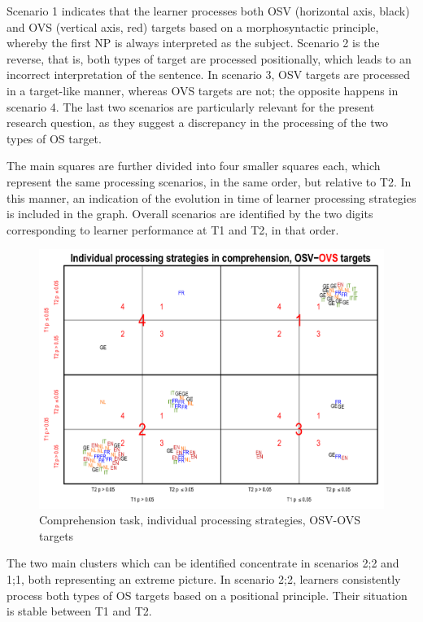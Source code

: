 Scenario 1 indicates that the learner processes both OSV (horizontal axis, black) and OVS (vertical axis, red) targets based on a morphosyntactic principle, whereby the first NP is always interpreted as the subject. Scenario 2 is the reverse, that is, both types of target are processed positionally, which leads to an incorrect interpretation of the sentence. In scenario 3, OSV targets are processed in a target-like manner, whereas OVS targets are not; the opposite happens in scenario 4. The last two scenarios are particularly relevant for the present research question, as they suggest a discrepancy in the processing of the two types of OS target.

The main squares are further divided into four smaller squares each, which represent the same processing scenarios, in the same order, but relative to T2. In this manner, an indication of the evolution in time of learner processing strategies is included in the graph. Overall scenarios are identified by the two digits corresponding to learner performance at T1 and T2, in that order.

\begin{figure}
    \includegraphics[width=\textwidth]{figures/05-8.pdf}
    \caption{Comprehension task, individual processing strategies, OSV-OVS targets}
    \label{fig:05:8}
\end{figure}

The two main clusters which can be identified concentrate in scenarios 2;2 and 1;1, both representing an extreme picture. In scenario 2;2, learners consistently process both types of OS targets based on a positional principle. Their situation is stable between T1 and T2. 

